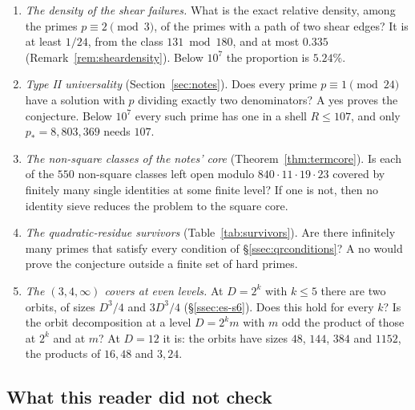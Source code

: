 \begin{enumerate}[label=\arabic*.]
\begin{itemize}
\item Along the strict records up to $3\cdot10^9$, $h$ takes the values $1,2,3,6,8,15,27$.
\item Below $3\cdot10^9$ the next largest values are $21$, $20$ and $19$, at nine primes (Proposition~\ref{prop:records}).
\item Every record after $73$ lies in a hard class (Corollary~\ref{cor:hle2}).
\item The workbench states no conjecture on the growth of $h(p)$, and none is stated here.
\end{itemize}
\item \emph{The density of the shear failures.} What is the exact relative density, among the primes $p\equiv2\pmod3$, of the primes with a path of two shear edges? It is at least $1/24$, from the class $131\bmod180$, and at most $0.335$ (Remark~\ref{rem:sheardensity}). Below $10^7$ the proportion is $5.24\%$.
\item \emph{Type II universality} (Section~\ref{sec:notes}). Does every prime $p\equiv1\pmod{24}$ have a solution with $p$ dividing exactly two denominators? A yes proves the conjecture. Below $10^7$ every such prime has one in a shell $R\le107$, and only $p_*=8{,}803{,}369$ needs $107$.
\item \emph{The non-square classes of the notes' core} (Theorem~\ref{thm:termcore}). Is each of the $550$ non-square classes left open modulo $840\cdot11\cdot19\cdot23$ covered by finitely many single identities at some finite level? If one is not, then no identity sieve reduces the problem to the square core.
\item \emph{The quadratic-residue survivors} (Table~\ref{tab:survivors}). Are there infinitely many primes that satisfy every condition of §\ref{ssec:qrconditions}? A no would prove the conjecture outside a finite set of hard primes.
\item \emph{The $(3,4,\infty)$ covers at even levels.} At $D=2^k$ with $k\le5$ there are two orbits, of sizes $D^3/4$ and $3D^3/4$ (§\ref{ssec:es-s6}). Does this hold for every $k$? Is the orbit decomposition at a level $D=2^km$ with $m$ odd the product of those at $2^k$ and at $m$? At $D=12$ it is: the orbits have sizes $48$, $144$, $384$ and $1152$, the products of $16,48$ and $3,24$.
\end{enumerate}

\subsection{What this reader did not check}

